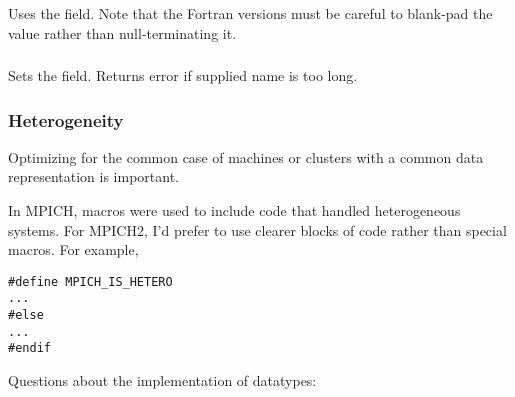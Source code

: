 \documentclass{article}
\begin{document}
\subsubsection{}
Uses the  field.  Note that the Fortran versions must be careful to
blank-pad the value rather than null-terminating it.

\subsubsection{}
Sets the  field.  Returns error if supplied name is too long.

\subsubsection{}
\subsubsection{}

\subsubsection{}

\subsubsection{Heterogeneity}
\label{sec:hetero}
Optimizing for the common case of machines or clusters with a common
data representation is important.  

In MPICH, macros were used to include code that handled heterogeneous
systems.  For MPICH2, I'd prefer to use clearer blocks of code rather
than special macros.  For example,
\begin{verbatim}
#define MPICH_IS_HETERO
...
#else
...
#endif
\end{verbatim}

Questions about the implementation of datatypes:
\end{document}
